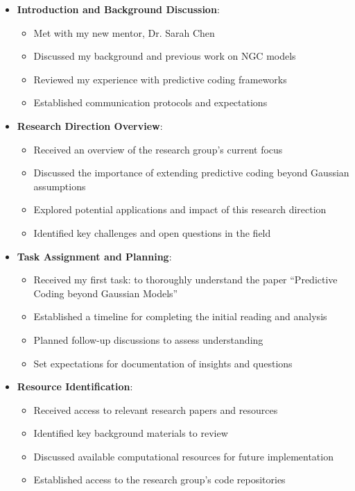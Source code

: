 \documentclass{article}
\begin{document}
\begin{itemize}
  \item \textbf{Introduction and Background Discussion}:
  \begin{itemize}
    \item Met with my new mentor, Dr. Sarah Chen
    \item Discussed my background and previous work on NGC models
    \item Reviewed my experience with predictive coding frameworks
    \item Established communication protocols and expectations
  \end{itemize}

  \item \textbf{Research Direction Overview}:
  \begin{itemize}
    \item Received an overview of the research group's current focus
    \item Discussed the importance of extending predictive coding beyond Gaussian assumptions
    \item Explored potential applications and impact of this research direction
    \item Identified key challenges and open questions in the field
  \end{itemize}

  \item \textbf{Task Assignment and Planning}:
  \begin{itemize}
    \item Received my first task: to thoroughly understand the paper ``Predictive Coding beyond Gaussian Models''
    \item Established a timeline for completing the initial reading and analysis
    \item Planned follow-up discussions to assess understanding
    \item Set expectations for documentation of insights and questions
  \end{itemize}

  \item \textbf{Resource Identification}:
  \begin{itemize}
    \item Received access to relevant research papers and resources
    \item Identified key background materials to review
    \item Discussed available computational resources for future implementation
    \item Established access to the research group's code repositories
  \end{itemize}
\end{itemize}
\end{document}
